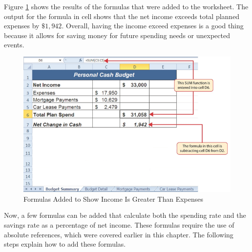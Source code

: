 Figure \ref{02:fig38} shows the results of the formulas that were added to the  worksheet. The output for the formula in cell  shows that the net income exceeds total planned expenses by $ \$1,942 $. Overall, having the income exceed expenses is a good thing because it allows for saving money for future spending needs or unexpected events.

\begin{figure}[H]
	\centering
	\includegraphics[width=\maxwidth{.95\linewidth}]{gfx/ch02_fig38}
	\caption{Formulas Added to Show Income Is Greater Than Expenses}
	\label{02:fig38}
\end{figure}

Now, a few formulas can be added that calculate both the spending rate and the savings rate as a percentage of net income. These formulas require the use of absolute references, which were covered earlier in this chapter. The following steps explain how to add these formulas.

